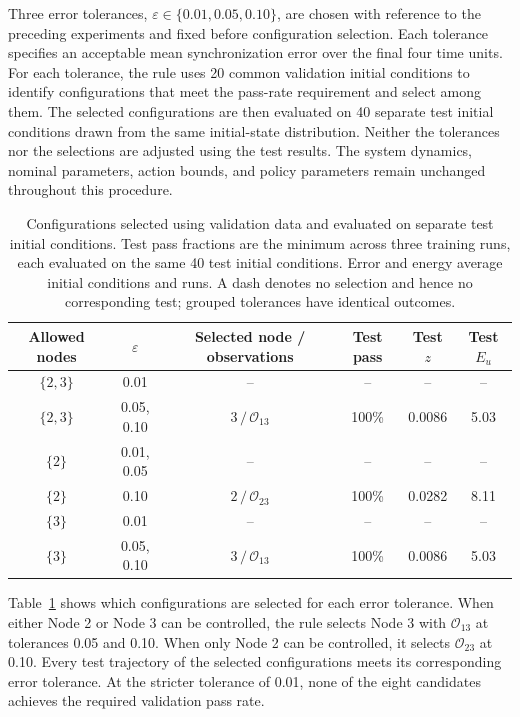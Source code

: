 \documentclass[a4paper,fleqn]{cas-dc}
\theoremstyle{plain}
\theoremstyle{definition}
\begin{document}
Three error tolerances, $\varepsilon\in\{0.01,0.05,0.10\}$, are chosen with reference to the preceding experiments and fixed before configuration selection. Each tolerance specifies an acceptable mean synchronization error over the final four time units. For each tolerance, the rule uses 20 common validation initial conditions to identify configurations that meet the pass-rate requirement and select among them. The selected configurations are then evaluated on 40 separate test initial conditions drawn from the same initial-state distribution. Neither the tolerances nor the selections are adjusted using the test results. The system dynamics, nominal parameters, action bounds, and policy parameters remain unchanged throughout this procedure.

\begin{table}[pos=!t,width=\textwidth]
\centering
\caption{Configurations selected using validation data and evaluated on separate test initial conditions. Test pass fractions are the minimum across three training runs, each evaluated on the same 40 test initial conditions. Error and energy average initial conditions and runs. A dash denotes no selection and hence no corresponding test; grouped tolerances have identical outcomes.}
\label{tab:configuration_selection}
\small
\begin{tabular}{cccccc}
\toprule
Allowed nodes & $\varepsilon$ & Selected node / observations & Test pass & Test $z$ & Test $E_u$\\
\midrule
$\{2,3\}$ & 0.01 & -- & -- & -- & --\\
$\{2,3\}$ & 0.05, 0.10 & $3\,/\,\mathcal O_{13}$ & 100\% & 0.0086 & 5.03\\
$\{2\}$ & 0.01, 0.05 & -- & -- & -- & --\\
$\{2\}$ & 0.10 & $2\,/\,\mathcal O_{23}$ & 100\% & 0.0282 & 8.11\\
$\{3\}$ & 0.01 & -- & -- & -- & --\\
$\{3\}$ & 0.05, 0.10 & $3\,/\,\mathcal O_{13}$ & 100\% & 0.0086 & 5.03\\
\bottomrule
\end{tabular}
\end{table}

Table~\ref{tab:configuration_selection} shows which configurations are selected for each error tolerance. When either Node 2 or Node 3 can be controlled, the rule selects Node 3 with $\mathcal O_{13}$ at tolerances 0.05 and 0.10. When only Node 2 can be controlled, it selects $\mathcal O_{23}$ at 0.10. Every test trajectory of the selected configurations meets its corresponding error tolerance. At the stricter tolerance of 0.01, none of the eight candidates achieves the required validation pass rate.
\end{document}
